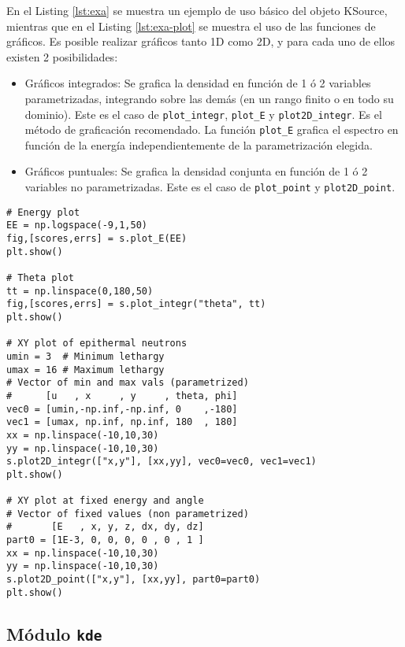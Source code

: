 En el Listing \ref{lst:exa} se muestra un ejemplo de uso básico del objeto KSource, mientras que en el Listing \ref{lst:exa-plot} se muestra el uso de las funciones de gráficos. Es posible realizar gráficos tanto 1D como 2D, y para cada uno de ellos existen 2 posibilidades:
\begin{itemize}
	\item Gráficos integrados: Se grafica la densidad en función de 1 ó 2 variables parametrizadas, integrando sobre las demás (en un rango finito o en todo su dominio). Este es el caso de \verb|plot_integr|, \verb|plot_E| y \verb|plot2D_integr|. Es el método de graficación recomendado. La función \verb|plot_E| grafica el espectro en función de la energía independientemente de la parametrización elegida. 
	\item Gráficos puntuales: Se grafica la densidad conjunta en función de 1 ó 2 variables no parametrizadas. Este es el caso de \verb|plot_point| y \verb|plot2D_point|.
\end{itemize}

\begin{lstlisting}[language=Python2, label={lst:exa-plot}, caption=Ejemplo de gráficos de distribuciones estimadas.]
# Energy plot
EE = np.logspace(-9,1,50)
fig,[scores,errs] = s.plot_E(EE)
plt.show()

# Theta plot
tt = np.linspace(0,180,50)
fig,[scores,errs] = s.plot_integr("theta", tt)
plt.show()

# XY plot of epithermal neutrons
umin = 3  # Minimum lethargy
umax = 16 # Maximum lethargy
# Vector of min and max vals (parametrized)
#      [u   , x     , y     , theta, phi]
vec0 = [umin,-np.inf,-np.inf, 0    ,-180]
vec1 = [umax, np.inf, np.inf, 180  , 180]
xx = np.linspace(-10,10,30)
yy = np.linspace(-10,10,30)
s.plot2D_integr(["x,y"], [xx,yy], vec0=vec0, vec1=vec1)
plt.show()

# XY plot at fixed energy and angle
# Vector of fixed values (non parametrized)
#       [E   , x, y, z, dx, dy, dz]
part0 = [1E-3, 0, 0, 0, 0 , 0 , 1 ]
xx = np.linspace(-10,10,30)
yy = np.linspace(-10,10,30)
s.plot2D_point(["x,y"], [xx,yy], part0=part0)
plt.show()
\end{lstlisting}


\subsection{Módulo \texttt{kde}}


